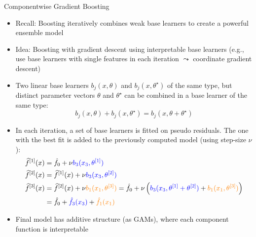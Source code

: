 \documentclass[11pt,compress,t,notes=noshow, aspectratio=169, xcolor=table]{beamer}
\begin{document}
\begin{frame}{Componentwise Gradient Boosting}

\begin{itemize}
\item<1-> Recall: Boosting iteratively combines weak base learners to create a powerful ensemble model
\item<1->
Idea: Boosting with gradient descent using interpretable base learners (e.g., use base learners with single features in each iteration $\leadsto$ coordinate gradient descent)
\item<2->
Two linear base learners $b_j(x, \theta)$ and $b_j(x, \theta^{\star})$ of the same type, but distinct parameter vectors $\theta$ and $\theta^{\star}$ can be combined in a base learner of the same type:
$$b_j(x, \theta) + b_j(x, \theta^{\star}) = b_j(x, \theta + \theta^{\star})$$
\item<3-> In each iteration, a set of base learners is fitted on pseudo residuals. The one with the best fit is added to the previously computed model (using step-size $\nu$):
\medskip
\begin{align*}
\widehat{f}^{[1]}(x) &= \hat{f}_0 + \nu \textcolor{blue}{b_3(x_3, \theta^{[1]})} \\
\widehat{f}^{[2]}(x) &= \widehat{f}^{[1]}(x) + \nu \textcolor{blue}{b_3(x_3, \theta^{[2]})} 
\\
\widehat{f}^{[3]}(x) &= \widehat{f}^{[2]}(x) + \nu \textcolor{orange}{b_1(x_1, \theta^{[3]})} 
= \hat{f}_0 + \nu \left(\textcolor{blue}{b_3(x_3, \theta^{[1]} + \theta^{[2]})} + \textcolor{orange}{b_1(x_1, \theta^{[3]})}\right) 
\\
&= \hat{f}_0 + \textcolor{blue}{\hat{f}_3(x_3)} + \textcolor{orange}{\hat{f}_1(x_1)}
\end{align*}
\item<3-> Final model has additive structure (as GAMs), where each component function is interpretable

\end{itemize}
\end{frame}
\end{document}
